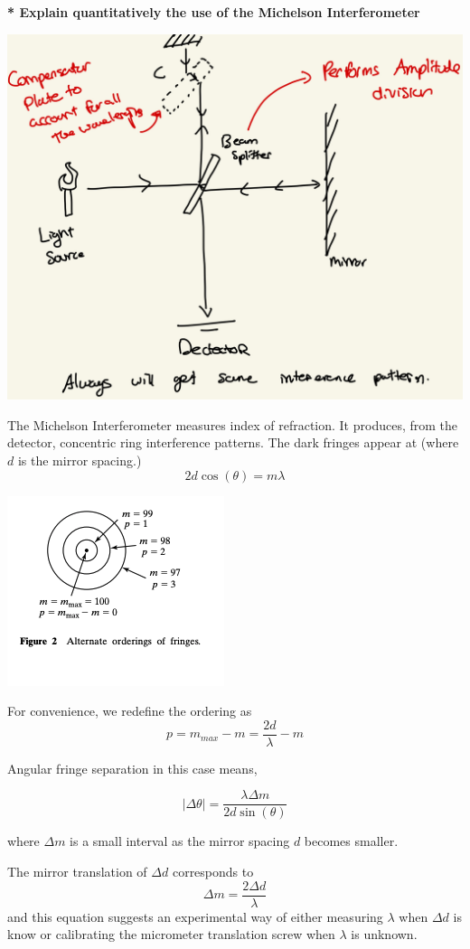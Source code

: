 \documentclass[10pt]{article}
\newcommand*{\lo}[1]{
    \textbf{* #1} \newline
}
\begin{document}
\lo{Explain quantitatively the use of the Michelson Interferometer}

\begin{center}
    \includegraphics*[scale = .2]{imgs/michelson-infrometer.jpeg}
\end{center}

The Michelson Interferometer measures index of refraction. It produces, from the detector, concentric ring interference patterns. The dark fringes appear at (where $d$ is the mirror spacing.)
\[2d\cos(\theta) = m\lambda\]

\newpage

\begin{center}
    \includegraphics*[scale = 1]{imgs/ordering.png}
\end{center}

For convenience, we redefine the ordering as \[p = m_{max} - m = \frac{2d}{\lambda} - m\]

Angular fringe separation in this case means,

\[|\Delta \theta| = \frac{\lambda \Delta m}{2d\sin(\theta)}\]

where $\Delta m$ is a small interval as the mirror spacing $d$ becomes smaller.

\newblock

The mirror translation of $\Delta d$ corresponds to 
\[\Delta m = \frac{2 \Delta d}{\lambda}\]
and this equation suggests an experimental way of either measuring $\lambda$ when $\Delta d$ is know or calibrating the micrometer translation screw when $\lambda$ is unknown.
\end{document}
